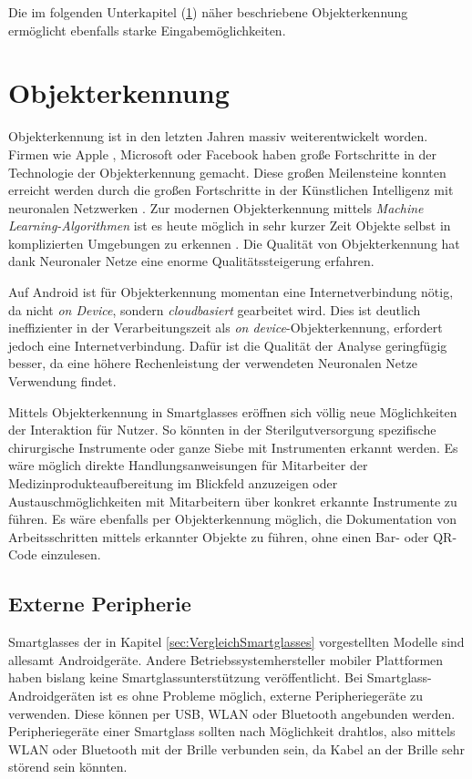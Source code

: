 Die im folgenden Unterkapitel (\ref{sec:Objekterkennung}) näher beschriebene Objekterkennung ermöglicht ebenfalls starke Eingabemöglichkeiten.
%
%
%
%
%
%
\section{Objekterkennung}
\label{sec:Objekterkennung}
Objekterkennung ist in den letzten Jahren massiv weiterentwickelt worden. Firmen wie Apple \cite{Apple2018b}, Microsoft \cite{Girshick2015} oder Facebook \cite{Schroepfer2015} haben große Fortschritte in der Technologie der Objekterkennung gemacht. Diese großen Meilensteine konnten erreicht werden durch die großen Fortschritte in der Künstlichen Intelligenz mit neuronalen Netzwerken \cite{Apple2018b, Schroepfer2015}. Zur modernen Objekterkennung mittels \emph{Machine Learning-Algorithmen} ist es heute möglich in sehr kurzer Zeit Objekte selbst in komplizierten Umgebungen zu erkennen \cite{Schroepfer2015}. 
Die Qualität von Objekterkennung hat dank Neuronaler Netze eine enorme Qualitätssteigerung erfahren.

Auf Android ist für Objekterkennung momentan eine Internetverbindung nötig, da nicht \emph{on Device}, sondern \emph{cloudbasiert} gearbeitet wird. Dies ist deutlich ineffizienter in der Verarbeitungszeit als \emph{on device}-Objekterkennung, erfordert jedoch eine Internetverbindung. Dafür ist die Qualität der Analyse geringfügig besser, da eine höhere Rechenleistung der verwendeten Neuronalen Netze Verwendung findet.

Mittels Objekterkennung in Smartglasses eröffnen sich völlig neue Möglichkeiten der Interaktion für Nutzer. So könnten in der Sterilgutversorgung spezifische chirurgische Instrumente oder ganze Siebe mit Instrumenten erkannt werden. Es wäre möglich direkte Handlungsanweisungen für Mitarbeiter der Medizinprodukteaufbereitung im Blickfeld anzuzeigen oder Austauschmöglichkeiten mit Mitarbeitern über konkret erkannte Instrumente zu führen. Es wäre ebenfalls per Objekterkennung möglich, die Dokumentation von Arbeitsschritten mittels erkannter Objekte zu führen, ohne einen Bar- oder QR-Code einzulesen.
%
%
%
%
%
%
\subsection{Externe Peripherie}
\label{sec:Externe_Peripherie}
Smartglasses der in Kapitel \ref{sec:VergleichSmartglasses} vorgestellten Modelle sind allesamt Androidgeräte. Andere Betriebssystemhersteller mobiler Plattformen haben bislang keine Smartglassunterstützung veröffentlicht. Bei Smartglass-Androidgeräten ist es ohne Probleme möglich, externe Peripheriegeräte zu verwenden. Diese können per USB, WLAN oder Bluetooth angebunden werden.  Peripheriegeräte einer Smartglass sollten nach Möglichkeit drahtlos, also mittels WLAN oder Bluetooth mit der Brille verbunden sein, da Kabel an der Brille sehr störend sein könnten. 

